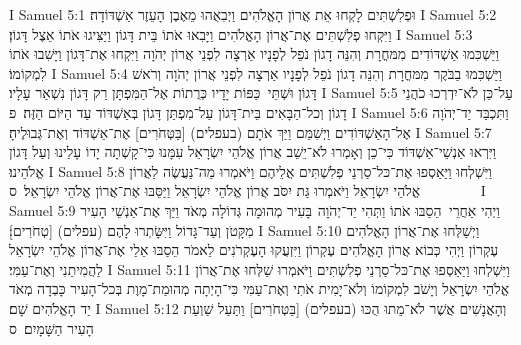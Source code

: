 I Samuel 5:1	וּפְלִשְׁתִּים לָקְחוּ אֵת אֲרוֹן הָאֱלֹהִים וַיְבִאֻהוּ מֵאֶבֶן הָעֵזֶר אַשְׁדּוֹדָה׃
I Samuel 5:2	וַיִּקְחוּ פְלִשְׁתִּים אֶת־אֲרוֹן הָאֱלֹהִים וַיָּבִאוּ אֹתוֹ בֵּית דָּגוֹן וַיַּצִּיגוּ אֹתוֹ אֵצֶל דָּגוֹן׃
I Samuel 5:3	וַיַּשְׁכִּמוּ אַשְׁדּוֹדִים מִמּחֳרָת וְהִנֵּה דָגוֹן נֹפֵל לְפָנָיו אַרְצָה לִפְנֵי אֲרוֹן יְהֹוָה וַיִּקְחוּ אֶת־דָּגוֹן וַיָּשִׁבוּ אֹתוֹ לִמְקוֹמוֹ׃
I Samuel 5:4	וַיַּשְׁכִּמוּ בַבֹּקֶר מִמּחֳרָת וְהִנֵּה דָגוֹן נֹפֵל לְפָנָיו אַרְצָה לִפְנֵי אֲרוֹן יְהֹוָה וְרֹאשׁ דָּגוֹן וּשְׁתֵּי  כַּפּוֹת יָדָיו כְּרֻתוֹת אֶל־הַמִּפְתָּן רַק דָּגוֹן נִשְׁאַר עָלָיו׃
I Samuel 5:5	עַל־כֵּן לֹא־יִדְרְכוּ כֹהֲנֵי דָגוֹן וְכל־הַבָּאִים בֵּית־דָּגוֹן עַל־מִפְתַּן דָּגוֹן בְּאַשְׁדּוֹד עַד הַיּוֹם הַזֶּה׃ {פ}
I Samuel 5:6	וַתִּכְבַּד יַד־יְהֹוָה אֶל־הָאַשְׁדּוֹדִים וַיְשִׁמֵּם וַיַּךְ אֹתָם (בעפלים) [בַּטְּחֹרִים] אֶת־אַשְׁדּוֹד וְאֶת־גְּבוּלֶיהָ׃
I Samuel 5:7	וַיִּרְאוּ אַנְשֵׁי־אַשְׁדּוֹד כִּי־כֵן וְאָמְרוּ לֹא־יֵשֵׁב אֲרוֹן אֱלֹהֵי יִשְׂרָאֵל עִמָּנוּ כִּי־קָשְׁתָה יָדוֹ עָלֵינוּ וְעַל דָּגוֹן אֱלֹהֵינוּ׃
I Samuel 5:8	וַיִּשְׁלְחוּ וַיַּאַסְפוּ אֶת־כּל־סַרְנֵי פְלִשְׁתִּים אֲלֵיהֶם וַיֹּאמְרוּ מַה־נַּעֲשֶׂה לַאֲרוֹן אֱלֹהֵי יִשְׂרָאֵל וַיֹּאמְרוּ גַּת יִסֹּב אֲרוֹן אֱלֹהֵי יִשְׂרָאֵל וַיַּסֵּבּוּ אֶת־אֲרוֹן אֱלֹהֵי יִשְׂרָאֵל׃ {ס}        
I Samuel 5:9	וַיְהִי אַחֲרֵי  הֵסַבּוּ אֹתוֹ וַתְּהִי יַד־יְהֹוָה  בָּעִיר מְהוּמָה גְּדוֹלָה מְאֹד וַיַּךְ אֶת־אַנְשֵׁי הָעִיר מִקָּטֹן וְעַד־גָּדוֹל וַיִּשָּׂתְרוּ לָהֶם (עפלים) [טְחֹרִים]׃
I Samuel 5:10	וַיְשַׁלְּחוּ אֶת־אֲרוֹן הָאֱלֹהִים עֶקְרוֹן וַיְהִי כְּבוֹא אֲרוֹן הָאֱלֹהִים עֶקְרוֹן וַיִּזְעֲקוּ הָעֶקְרֹנִים לֵאמֹר הֵסַבּוּ אֵלַי אֶת־אֲרוֹן אֱלֹהֵי יִשְׂרָאֵל לַהֲמִיתֵנִי וְאֶת־עַמִּי׃
I Samuel 5:11	וַיִּשְׁלְחוּ וַיַּאַסְפוּ אֶת־כּל־סַרְנֵי פְלִשְׁתִּים וַיֹּאמְרוּ שַׁלְּחוּ אֶת־אֲרוֹן אֱלֹהֵי יִשְׂרָאֵל וְיָשֹׁב לִמְקוֹמוֹ וְלֹא־יָמִית אֹתִי וְאֶת־עַמִּי כִּי־הָיְתָה מְהוּמַת־מָוֶת בְּכל־הָעִיר כָּבְדָה מְאֹד יַד הָאֱלֹהִים שָׁם׃
I Samuel 5:12	וְהָאֲנָשִׁים אֲשֶׁר לֹא־מֵתוּ הֻכּוּ (בעפלים) [בַּטְּחֹרִים] וַתַּעַל שַׁוְעַת הָעִיר הַשָּׁמָיִם׃ {ס}        
